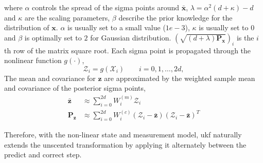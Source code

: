 where $\alpha$ controls the spread of the sigma points around $\bar{\mathbf{x}}$, 
$\lambda = \alpha^{2}(d+\kappa)-d$ and $\kappa$ are the scaling parameters,
$\beta$ describe the prior knowledge for the distribution of $\mathbf{x}$.
$\alpha$ is usually set to a small value (\eg $1e-3$),
$\kappa$ is usually set to 0 and $\beta$ is optimally set to $2$ for Gaussian distribution.
$(\sqrt{(d+\lambda)\mathbf{P_x}})_i$ is the $i$th row of the matrix square root. 
Each sigma point is propagated through the nonlinear function $g(\cdot)$, 
$$\mathcal{Z}_{i} = g(\mathcal{X}_i) \qquad i = 0, 1, \dots, 2d,$$
The mean and covariance for $\mathbf{z}$ are approximated by the weighted sample mean and covariance of the posterior sigma points,
\begin{align}
\bar{\mathbf{z}} & \approx \sum_{i=0}^{2d}{W_i^{(m)}\mathcal{Z}_i}\\
\mathbf{P_z} & \approx \sum_{i=0}^{2d}{W_i^{(c)}(\mathcal{Z}_i-\bar{\mathbf{z}})(\mathcal{Z}_i-\bar{\mathbf{z}})^T}
\end{align}

Therefore, with the non-linear state and measurement model, \gls{ukf} naturally extends the unscented transformation by applying it alternately between the predict and correct step.